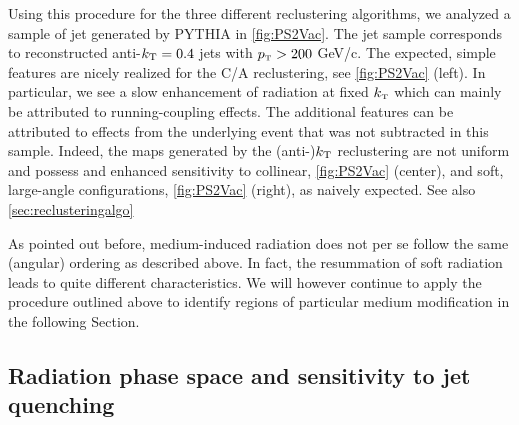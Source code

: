 Using this procedure for the three different reclustering algorithms, we analyzed a sample of jet generated by PYTHIA in \autoref{fig:PS2Vac}. The jet sample corresponds to reconstructed anti-$k_{\rm \tiny T} = 0.4$ jets with $p_{\text{\tiny T}} > 200 $ GeV/c. The expected, simple features are nicely realized for the C/A reclustering, see \autoref{fig:PS2Vac} (left). In particular, we see a slow enhancement of radiation at fixed $k_{\text{\tiny T}}$ which can mainly be attributed to running-coupling effects. The additional features can be attributed to effects from the underlying event that was not subtracted in this sample. Indeed, the maps generated by the (anti-)$k_{\rm \tiny T}$ reclustering are not uniform and possess and enhanced sensitivity to collinear, \autoref{fig:PS2Vac} (center), and soft, large-angle configurations, \autoref{fig:PS2Vac} (right), as naively expected.
See also \autoref{sec:reclusteringalgo}

As pointed out before, medium-induced radiation does not per se follow the same (angular) ordering as described above. In fact, the resummation of soft radiation leads to quite different characteristics. We will however continue to apply the procedure outlined above to identify regions of particular medium modification in the following Section. 



\subsection{Radiation phase space and sensitivity to jet quenching}
\label{sec:phasespace-mc}



